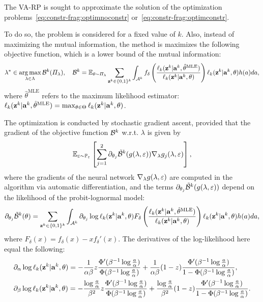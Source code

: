 The VA-RP is sought to approximate the solution of the optimization problems~\eqref{eq:constr-frag:optimnoconstr} or~\eqref{eq:constr-frag:optimconstr}.

To do so, the problem is considered for a fixed value of $k$. 
Also, instead of maximizing the mutual information, the method is maximizes the following objective function, which is a lower bound of the mutual information:
    \begin{equation}
        \lambda^\ast\in\operatorname*{arg\,max}_{\lambda\in\Lambda} \mathcal{B}^k(\varPi_\lambda),\quad \mathcal{B}^k= \mathbb{E}_{\theta\sim\varPi_\lambda}\sum_{\mathbf{z}^k\in\{0,1\}^k}\int_{\mathcal{A}^k}f_\delta\left(\frac{\ell_k(\mathbf{z}^k|\mathbf{a}^k,\hat\theta^{\text{MLE}})}{\ell_k(\mathbf{z}^k|\mathbf{a}^k,\theta)}\right) \ell_k(\mathbf{z}^k|\mathbf{a}^k,\theta)h(a)da,
    \end{equation}
where $\hat\theta^{\text{MLE}}$ refers to the maximum likelihood estimator: $\ell_k(\mathbf{z}^k|\mathbf{a}^k,\hat\theta^{\text{MLE}}) = \max_{\theta\in\Theta}\ell_k(\mathbf{z}^k|\mathbf{a}^k,\theta) $.


The optimization is conducted by stochastic gradient ascent, provided that the gradient of the objective function $\mathcal{B}^k$ w.r.t. $\lambda$ is given by
    \begin{equation}
        \mathbb{E}_{\varepsilon\sim\mathbb{P}_\varepsilon}\left[\sum_{j=1}^{2}\partial_{\theta_j}\tilde{\mathcal{B}}^k(g(\lambda,\varepsilon))\nabla_\lambda g_j(\lambda,\varepsilon)
        \right],
    \end{equation}
where the gradients of the neural network $\nabla_\lambda g(\lambda,\varepsilon)$ are computed in the algorithm via automatic differentiation, and the terms $\partial_{\theta_j}\tilde{\mathcal{B}}^k(g(\lambda,\varepsilon))$  depend on the likelihood of %
the probit-lognormal model:
    \begin{equation}
        \partial_{\theta_j}\tilde{\mathcal{B}}^k(\theta) = \sum_{\mathbf{z}^k\in\{0,1\}^k}\int_{\mathcal{A}^k} \partial_{\theta_j}\log\ell_k(\mathbf{z}^k|\mathbf{a}^k,\theta) F_\delta\left(\frac{\ell_k(\mathbf{z}^k|\mathbf{a}^k,\hat\theta^{\text{MLE}})}{\ell_k(\mathbf{z}^k|\mathbf{a}^k,\theta)}\right)\ell_k(\mathbf{z}^k|\mathbf{a}^k,\theta)h(a)da,
    \end{equation}
where $F_\delta(x) = f_\delta(x)-xf_\delta'(x)$.
The derivatives of the log-likelihood here equal the following:
    \begin{equation}
        \begin{aligned}
            &\partial_\alpha\log\ell_k(\mathbf{z}^k|\mathbf{a}^k,\theta) =  -\frac{1}{\alpha\beta}z\frac{\Phi'(\beta^{-1}\log\frac{a}{\alpha})}{\Phi(\beta^{-1}\log\frac{a}{\alpha})} + \frac{1}{\alpha\beta}(1-z)\frac{\Phi'(\beta^{-1}\log\frac{a}{\alpha})}{1-\Phi(\beta^{-1}\log\frac{a}{\alpha})} , \\
            &\partial_\beta\log\ell_k(\mathbf{z}^k|\mathbf{a}^k,\theta) = -\frac{\log\frac{a}{\alpha}}{\beta^2}z\frac{\Phi'(\beta^{-1}\log\frac{a}{\alpha})}{\Phi(\beta^{-1}\log\frac{a}{\alpha})}+ \frac{\log\frac{a}{\alpha}}{\beta^2}(1-z)\frac{\Phi'(\beta^{-1}\log\frac{a}{\alpha})}{1-\Phi(\beta^{-1}\log\frac{a}{\alpha})} .
        \end{aligned}
    \end{equation}



